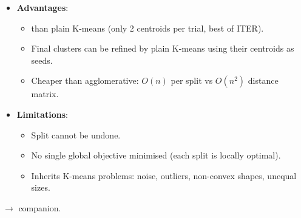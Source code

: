 {\begin{itemize}
\begin{itemize}
    \item Each bisection $=$ 1 node split into 2 children.
    \item Recording the splits gives a top-down tree $=$ \textbf{dendrogram}.
    \item Run to $K=n$ $\rightarrow$ full hierarchy, 1 point per leaf.
  \end{itemize}
  \item \textbf{Advantages}:
  \begin{itemize}
    \item {} than plain K-means (only 2 centroids per trial, best of ITER).
    \item Final clusters can be refined by plain K-means using their centroids as seeds.
    \item Cheaper than agglomerative: $O(n)$ per split vs $O(n^2)$ distance matrix.
  \end{itemize}
  \item \textbf{Limitations}:
  \begin{itemize}
    \item Split cannot be undone.
    \item No single global objective minimised (each split is locally optimal).
    \item Inherits K-means problems: noise, outliers, non-convex shapes, unequal sizes.
  \end{itemize}
\end{itemize}}

\hr


{\color{sub}\footnotesize {}  \gap {}
$\rightarrow$ companion.}

